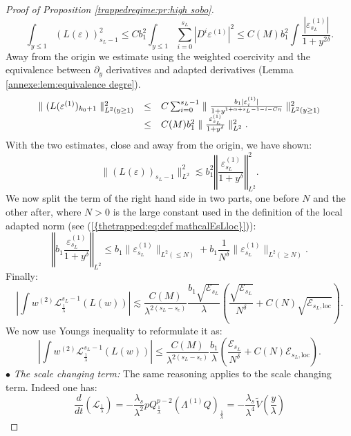 \documentclass[11pt,a4paper,reqno]{amsart}
\theoremstyle{remark}
\numberwithin{equation}{section}
\begin{document}
\begin{proof}[Proof of Proposition \ref{trappedregime:pr:high sobo}]
$$
\int_{y\leq 1}(L(\varepsilon))_{s_L-1}^2 \leq Cb_1^2 \int_{y\leq 1} \sum_{i=0}^{s_L} |D^{i}\varepsilon^{(1)}|^2 \leq C(M) b_1^2 \int \frac{|\varepsilon^{(1)}_{s_L}|}{1+y^{2\delta}} .
$$
Away from the origin we estimate using the weighted coercivity and the equivalence between $\partial_y$ derivatives and adapted derivatives (Lemma \ref{annexe:lem:equivalence degre}).
$$
\begin{array}{r c l}
\parallel (L(\varepsilon^{(1)})_{k_0+1}\parallel_{L^2(y\geq 1)}^2 &\leq & C\sum_{i=0}^{s_L-1} \parallel  \frac{b_1|\varepsilon^{(1)}_{i}|}{1+y^{1+\alpha+s_L-1-i-C\eta}} \parallel_{L^2(y\geq 1)}^2 \\
&\leq& C(M)b_1^2 \parallel \frac{\varepsilon^{(1)}_{s_L}}{1+y^{\delta}}\parallel_{L^2}^2 .
\end{array}
$$
With the two estimates, close and away from the origin, we have shown:
\begin{equation} \label{thetrapped:highsobo:eq:estimation intermediaire L}
\parallel (L(\varepsilon))_{s_L-1} \parallel_{L^2}^2 \lesssim b_1^2 \left\Vert \frac{\varepsilon^{(1)}_{s_L}}{1+y^{\delta}} \right\Vert_{L^2}^2 .
\end{equation}
We now split the term of the right hand side in two parts, one before $N$ and the other after, where $N>0$ is the large constant used in the definition of the local adapted norm (see {{\rm (\ref{{thetrapped:eq:def mathcalEsLloc}})}}):
$$
\left\Vert b_1\frac{\varepsilon^{(1)}_{s_L}}{1+y^{\delta}}\right\Vert_{L^2}\leq b_1 \parallel \varepsilon^{(1)}_{s_L}\parallel_{L^2(\leq N)}+b_1\frac{1}{N^{\delta}} \parallel \varepsilon^{(1)}_{s_L}\parallel_{L^2(\geq N)} .
$$
Finally:
$$
\left| \int w^{(2)}\mathcal{L}_{\frac{1}{\lambda}}^{s_L-1}(L(w))\right| \lesssim \frac{C(M)}{\lambda^{2(s_L-s_c)}}\frac{b_1\sqrt{\mathcal{E}_{s_L}}}{\lambda} \left(\frac{\sqrt{\mathcal{E}_{s_L}}}{N^{\delta}} +C(N)\sqrt{\mathcal{E}_{s_L,\text{loc}}} \right) .
$$
We now use Youngs inequality to reformulate it as:
\begin{equation} \label{thetrapped:highsobo:eq:estimation L}
\left| \int w^{(2)}\mathcal{L}_{\frac{1}{\lambda}}^{s_L-1}(L(w))\right| \leq \frac{C(M)}{\lambda^{2(s_L-s_c)}}\frac{b_1}{\lambda} \left(\frac{\mathcal{E}_{s_L}}{N^{\delta}} +C(N) \mathcal{E}_{s_L,\text{loc}} \right) .
\end{equation}
$\bullet$ \emph{The scale changing term:} The same reasoning applies to the scale changing term. Indeed one has:
$$
\frac{d}{dt}(\mathcal{L}_{\frac{1}{\lambda}})=-\frac{\lambda_s}{\lambda^2} pQ^{p-2}_{\frac{1}{\lambda}}(\Lambda^{(1)}Q)_{\frac{1}{\lambda}}=-\frac{\lambda_s}{\lambda^{4}}\tilde{V}\left(\frac{y}{\lambda}  \right)
$$
\end{proof}
\end{document}
